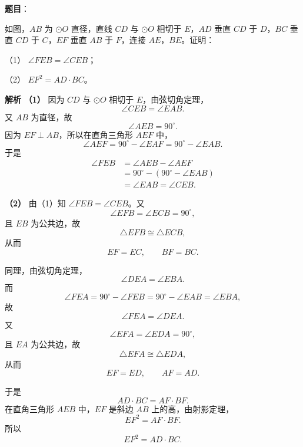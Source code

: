 \begin{answer}

\textbf{题目}：

如图，$AB$ 为 $\odot O$ 直径，直线 $CD$ 与 $\odot O$ 相切于 $E$，$AD$ 垂直 $CD$ 于 $D$，$BC$ 垂直 $CD$ 于 $C$，$EF$ 垂直 $AB$ 于 $F$，连接 $AE$，$BE$。证明：

（1） $\angle FEB=\angle CEB$；

（2） $EF^2=AD\cdot BC$。
\nopagebreak[4]
\begin{center}\end{center}
\nopagebreak[4]
\textbf{解析}
\textbf{（1）} 因为 $CD$ 与 $\odot O$ 相切于 $E$，由弦切角定理，
\nopagebreak[4]
\[\angle CEB=\angle EAB.\]
又 $AB$ 为直径，故
\nopagebreak[4]
\[\angle AEB=90^\circ.\]
因为 $EF\perp AB$，所以在直角三角形 $AEF$ 中，
\nopagebreak[4]
\[\angle AEF=90^\circ-\angle EAF=90^\circ-\angle EAB.\]
于是
\nopagebreak[4]
\[\begin{aligned}
\angle FEB&=\angle AEB-\angle AEF\\
&=90^\circ-\left(90^\circ-\angle EAB\right)\\
&=\angle EAB=\angle CEB.
\end{aligned}\]

\textbf{（2）} 由（1）知 $\angle FEB=\angle CEB$。又
\nopagebreak[4]
\[\angle EFB=\angle ECB=90^\circ,\]
且 $EB$ 为公共边，故
\nopagebreak[4]
\[\triangle EFB\cong\triangle ECB,\]
从而
\nopagebreak[4]
\[EF=EC,\qquad BF=BC.\]

同理，由弦切角定理，
\nopagebreak[4]
\[\angle DEA=\angle EBA.\]
而
\nopagebreak[4]
\[\angle FEA=90^\circ-\angle FEB=90^\circ-\angle EAB=\angle EBA,\]
故
\nopagebreak[4]
\[\angle FEA=\angle DEA.\]
又
\nopagebreak[4]
\[\angle EFA=\angle EDA=90^\circ,\]
且 $EA$ 为公共边，故
\nopagebreak[4]
\[\triangle EFA\cong\triangle EDA,\]
从而
\nopagebreak[4]
\[EF=ED,\qquad AF=AD.\]

于是
\nopagebreak[4]
\[AD\cdot BC=AF\cdot BF.\]
在直角三角形 $AEB$ 中，$EF$ 是斜边 $AB$ 上的高，由射影定理，
\nopagebreak[4]
\[EF^2=AF\cdot BF.\]
所以
\nopagebreak[4]
\[EF^2=AD\cdot BC.\]



\end{answer}
